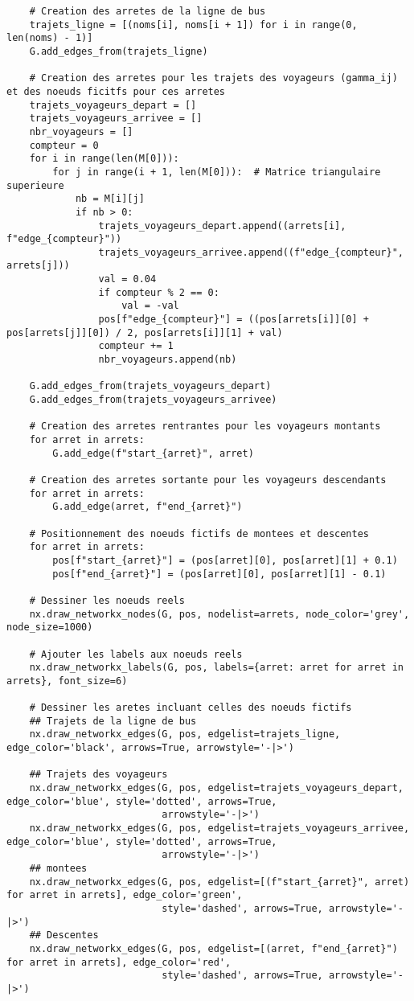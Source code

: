 \documentclass[12pt]{article}
\begin{document}
\begin{lstlisting}
    # Creation des arretes de la ligne de bus
    trajets_ligne = [(noms[i], noms[i + 1]) for i in range(0, len(noms) - 1)]
    G.add_edges_from(trajets_ligne)

    # Creation des arretes pour les trajets des voyageurs (gamma_ij) et des noeuds ficitfs pour ces arretes
    trajets_voyageurs_depart = []
    trajets_voyageurs_arrivee = []
    nbr_voyageurs = []
    compteur = 0
    for i in range(len(M[0])):
        for j in range(i + 1, len(M[0])):  # Matrice triangulaire superieure
            nb = M[i][j]
            if nb > 0:
                trajets_voyageurs_depart.append((arrets[i], f"edge_{compteur}"))
                trajets_voyageurs_arrivee.append((f"edge_{compteur}", arrets[j]))
                val = 0.04
                if compteur % 2 == 0:
                    val = -val
                pos[f"edge_{compteur}"] = ((pos[arrets[i]][0] + pos[arrets[j]][0]) / 2, pos[arrets[i]][1] + val)
                compteur += 1
                nbr_voyageurs.append(nb)

    G.add_edges_from(trajets_voyageurs_depart)
    G.add_edges_from(trajets_voyageurs_arrivee)

    # Creation des arretes rentrantes pour les voyageurs montants
    for arret in arrets:
        G.add_edge(f"start_{arret}", arret)

    # Creation des arretes sortante pour les voyageurs descendants
    for arret in arrets:
        G.add_edge(arret, f"end_{arret}")

    # Positionnement des noeuds fictifs de montees et descentes
    for arret in arrets:
        pos[f"start_{arret}"] = (pos[arret][0], pos[arret][1] + 0.1)
        pos[f"end_{arret}"] = (pos[arret][0], pos[arret][1] - 0.1)

    # Dessiner les noeuds reels
    nx.draw_networkx_nodes(G, pos, nodelist=arrets, node_color='grey', node_size=1000)

    # Ajouter les labels aux noeuds reels
    nx.draw_networkx_labels(G, pos, labels={arret: arret for arret in arrets}, font_size=6)

    # Dessiner les aretes incluant celles des noeuds fictifs
    ## Trajets de la ligne de bus
    nx.draw_networkx_edges(G, pos, edgelist=trajets_ligne, edge_color='black', arrows=True, arrowstyle='-|>')

    ## Trajets des voyageurs
    nx.draw_networkx_edges(G, pos, edgelist=trajets_voyageurs_depart, edge_color='blue', style='dotted', arrows=True,
                           arrowstyle='-|>')
    nx.draw_networkx_edges(G, pos, edgelist=trajets_voyageurs_arrivee, edge_color='blue', style='dotted', arrows=True,
                           arrowstyle='-|>')
    ## montees
    nx.draw_networkx_edges(G, pos, edgelist=[(f"start_{arret}", arret) for arret in arrets], edge_color='green',
                           style='dashed', arrows=True, arrowstyle='-|>')
    ## Descentes
    nx.draw_networkx_edges(G, pos, edgelist=[(arret, f"end_{arret}") for arret in arrets], edge_color='red',
                           style='dashed', arrows=True, arrowstyle='-|>')


\end{lstlisting}
\end{document}
